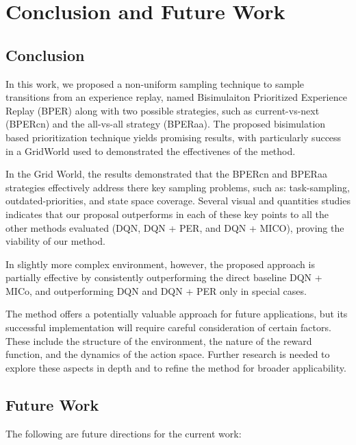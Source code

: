 
\chapter{Conclusion and Future Work}

\section{Conclusion}

In this work, we proposed a non-uniform sampling technique to sample transitions from an experience replay, named Bisimulaiton Prioritized Experience Replay (BPER) along with two possible strategies, such as current-vs-next (BPERcn) and the all-vs-all strategy (BPERaa). The proposed bisimulation based prioritization technique yields promising results, with particularly success in a GridWorld used to demonstrated the effectivenes of the method.

In the Grid World, the results demonstrated that the BPERcn and BPERaa strategies effectively address there key sampling problems, such as: task-sampling, outdated-priorities, and state space coverage. Several visual and quantities studies indicates that our proposal outperforms in each of these key points to all the other methods evaluated (DQN, DQN + PER, and DQN + MICO), proving the viability of our method.

In slightly more complex environment, however, the proposed approach is partially effective by consistently outperforming the direct baseline DQN + MICo, and outperforming DQN and DQN + PER only in special cases. 

The method offers a potentially valuable approach for future applications, but its successful implementation will require careful consideration of certain factors. These include the structure of the environment, the nature of the reward function, and the dynamics of the action space. Further research is needed to explore these aspects in depth and to refine the method for broader applicability.

\section{Future Work}

The following are future directions for the current work:

